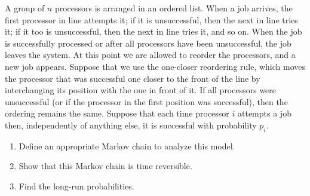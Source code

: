 \setcounter{exercise}{73}
\begin{exercise}%
\label{ex:markov-chains-74}
A group of $n$ processors is arranged in an ordered list. When a job arrives, the first processor in line attempts it; if it is unsuccessful, then the next in line tries it; if it too is unsuccessful, then the next in line tries it, and so on. When the job is successfully processed or after all processors have been unsuccessful, the job leaves the system. At this point we are allowed to reorder the processors, and a new job appears. Suppose that we use the one-closer reordering rule, which moves the processor that was successful one closer to the front of the line by interchanging its position with the one in front of it. If all processors were unsuccessful (or if the processor in the first position was successful), then the ordering remains the same. Suppose that each time processor $i$ attempts a job then, independently of anything else, it is successful with probability $p_i$.
\begin{enumerate}
\item[(a)] Define an appropriate Markov chain to analyze this model.
\item[(b)] Show that this Markov chain is time reversible.
\item[(c)] Find the long-run probabilities.
\end{enumerate}
\end{exercise}
